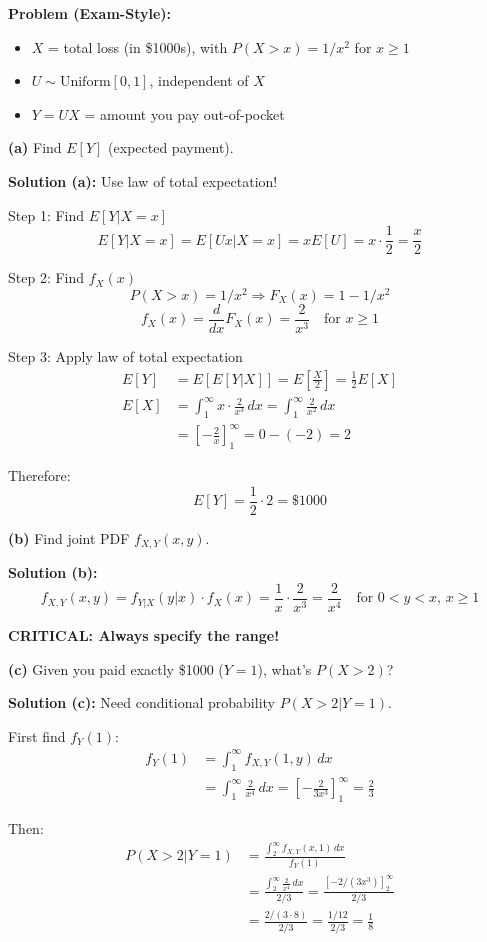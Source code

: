\documentclass[10pt,letterpaper]{article}
\begin{document}
\begin{examplebox}
\textbf{Problem (Exam-Style):}
\begin{itemize}
  \item $X$ = total loss (in \$1000s), with $P(X > x) = 1/x^2$ for $x \geq 1$
  \item $U \sim \text{Uniform}[0,1]$, independent of $X$
  \item $Y = UX$ = amount you pay out-of-pocket
\end{itemize}

\textbf{(a)} Find $E[Y]$ (expected payment).

\textbf{Solution (a):} Use law of total expectation!

Step 1: Find $E[Y|X=x]$
\[
E[Y|X=x] = E[Ux|X=x] = xE[U] = x \cdot \frac{1}{2} = \frac{x}{2}
\]

Step 2: Find $f_X(x)$
\[
P(X > x) = 1/x^2 \Rightarrow F_X(x) = 1 - 1/x^2
\]
\[
f_X(x) = \frac{d}{dx}F_X(x) = \frac{2}{x^3} \quad \text{for } x \geq 1
\]

Step 3: Apply law of total expectation
\begin{align*}
E[Y] &= E[E[Y|X]] = E\left[\frac{X}{2}\right] = \frac{1}{2}E[X] \\
E[X] &= \int_1^{\infty} x \cdot \frac{2}{x^3} \, dx = \int_1^{\infty} \frac{2}{x^2} \, dx \\
&= \left[-\frac{2}{x}\right]_1^{\infty} = 0 - (-2) = 2
\end{align*}

Therefore:
\[
E[Y] = \frac{1}{2} \cdot 2 = \boxed{\$1000}
\]

\textbf{(b)} Find joint PDF $f_{X,Y}(x,y)$.

\textbf{Solution (b):}
\[
f_{X,Y}(x,y) = f_{Y|X}(y|x) \cdot f_X(x) = \frac{1}{x} \cdot \frac{2}{x^3} = \boxed{\frac{2}{x^4}} \quad \text{for } 0 < y < x, \, x \geq 1
\]

\textbf{CRITICAL: Always specify the range!}

\textbf{(c)} Given you paid exactly \$1000 ($Y=1$), what's $P(X > 2)$?

\textbf{Solution (c):} Need conditional probability $P(X > 2 | Y = 1)$.

First find $f_Y(1)$:
\begin{align*}
f_Y(1) &= \int_1^{\infty} f_{X,Y}(1, y) \, dx \\
&= \int_1^{\infty} \frac{2}{x^4} \, dx = \left[-\frac{2}{3x^3}\right]_1^{\infty} = \frac{2}{3}
\end{align*}

Then:
\begin{align*}
P(X > 2 | Y = 1) &= \frac{\int_2^{\infty} f_{X,Y}(x, 1) \, dx}{f_Y(1)} \\
&= \frac{\int_2^{\infty} \frac{2}{x^4} \, dx}{2/3} = \frac{[-2/(3x^3)]_2^{\infty}}{2/3} \\
&= \frac{2/(3 \cdot 8)}{2/3} = \frac{1/12}{2/3} = \boxed{\frac{1}{8}}
\end{align*}
\end{examplebox}
\end{document}
